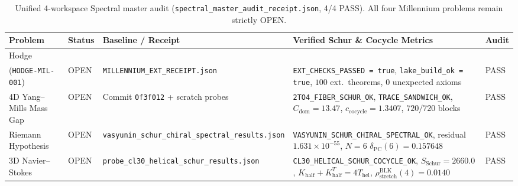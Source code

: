 \documentclass[11pt,a4paper]{article}
\begin{document}
\begin{table}[htbp]
\centering
\caption{Unified 4-workspace Spectral master audit (\texttt{spectral\_master\_audit\_receipt.json}, 4/4 PASS). All four Millennium problems remain strictly OPEN.}
\label{tab:spectral}
\footnotesize
\begin{tabular}{@{}>{\raggedright\arraybackslash}p{2.7cm}>{\raggedright\arraybackslash}p{1.2cm}>{\raggedright\arraybackslash}p{3.4cm}>{\raggedright\arraybackslash}p{5.8cm}l@{}}
\toprule
Problem & Status & Baseline / Receipt & Verified Schur \& Cocycle Metrics & Audit \\
\midrule
Hodge\\(\texttt{HODGE-MIL-001}) & OPEN & \texttt{MILLENNIUM\_EXT\_\-RECEIPT.json} & \texttt{EXT\_CHECKS\_\-PASSED = true}, \texttt{lake\_build\_ok = true}, $100$ ext.\ theorems, $0$ unexpected axioms & PASS \\
4D Yang--Mills Mass Gap & OPEN & Commit \texttt{0f3f012} + scratch probes & \texttt{2TO4\_FIBER\_SCHUR\_OK}, \texttt{TRACE\_SANDWICH\_OK}, $C_{\mathrm{dom}} = 13.47$, $c_{\mathrm{cocycle}} = 1.3407$, $720/720$ blocks & PASS \\
Riemann Hypothesis & OPEN & \texttt{vasyunin\_schur\_\-chiral\_spectral\_\-results.json} & \texttt{VASYUNIN\_SCHUR\_\-CHIRAL\_SPECTRAL\_OK}, residual $1.631\times 10^{-55}$, $N=6$ $\delta_{\mathrm{PC}}(6) = 0.157648$ & PASS \\
3D Navier--Stokes & OPEN & \texttt{probe\_cl30\_helical\_\-schur\_results.json} & \texttt{CL30\_HELICAL\_SCHUR\_\-COCYCLE\_OK}, $S_{\mathrm{Schur}} = 2660.0$, $K_{\mathrm{half}} + K_{\mathrm{half}}^T = 4T_{\mathrm{hel}}$, $\rho_{\mathrm{stretch}}^{\mathrm{BLK}}(4) = 0.0140$ & PASS \\
\bottomrule
\end{tabular}
\end{table}
\end{document}
